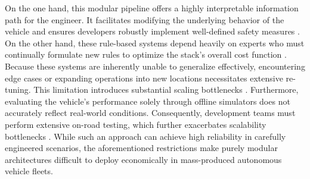 \newpage
On the one hand, this modular pipeline offers a highly interpretable information path for the engineer.
It facilitates modifying the underlying behavior of the vehicle and ensures developers robustly implement well-defined safety measures \cite{jain_Autonomy_20_2021, jahncke_MINDStackModularInterpretable_2025, karkus_DiffStackDifferentiableModular_2022, tampuu_SurveyEndtoEndDriving_2022, wang_VersatileEfficientReinforcement_2022}.
On the other hand, these rule-based systems depend heavily on experts who must continually formulate new rules to optimize the stack's overall cost function \cite{jain_Autonomy_20_2021, karkus_DiffStackDifferentiableModular_2022, wang_VersatileEfficientReinforcement_2022}.
Because these systems are inherently unable to generalize effectively, encountering edge cases or expanding operations into new locations necessitates extensive re-tuning.
This limitation introduces substantial scaling bottlenecks \cite{hu_review_2026, jain_Autonomy_20_2021, huang_DifferentiableIntegratedMotion_2024, karkus_DiffStackDifferentiableModular_2022}.
Furthermore, evaluating the vehicle's performance solely through offline simulators does not accurately reflect real-world conditions.
Consequently, development teams must perform extensive on-road testing, which further exacerbates scalability bottlenecks \cite{jain_Autonomy_20_2021}.
While such an approach can achieve high reliability in carefully engineered scenarios, the aforementioned restrictions make purely modular architectures difficult to deploy economically in mass-produced autonomous vehicle fleets.


